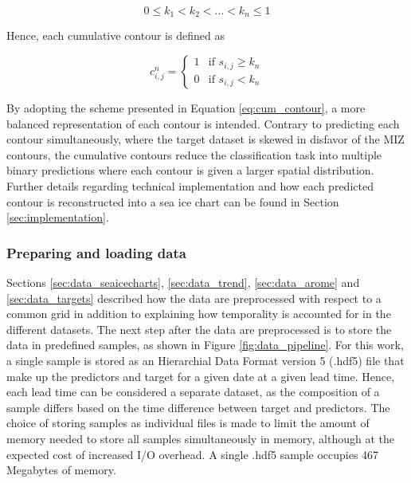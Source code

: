 \documentclass[../main/thesis]{subfiles}
\begin{document}
\begin{equation}
    \label{eq:cum_number}
    0 \leq k_1 < k_2 < \ldots < k_n \leq 1
\end{equation}

Hence, each cumulative contour is defined as

\begin{equation}
    \label{eq:cum_contour}
    c_{i,j}^n = \begin{cases}
        1 & \text{if } s_{i,j} \geq k_n \\
        0 & \text{if } s_{i,j} < k_n
    \end{cases}
\end{equation}

By adopting the scheme presented in Equation \ref{eq:cum_contour}, a more balanced representation of each contour is intended. Contrary to predicting each contour simultaneously, where the target dataset is skewed in disfavor of the MIZ contours, the cumulative contours reduce the classification task into multiple binary predictions where each contour is given a larger spatial distribution. Further details regarding technical implementation and how each predicted contour is reconstructed into a sea ice chart can be found in Section \ref{sec:implementation}.

\subsubsection{Preparing and loading data}
\label{sec:dataloader}
Sections \ref{sec:data_seaicecharts}, \ref{sec:data_trend}, \ref{sec:data_arome} and \ref{sec:data_targets} described how the data are preprocessed with respect to a common grid in addition to explaining how temporality is accounted for in the different datasets. The next step after the data are preprocessed is to store the data in predefined samples, as shown in Figure \ref{fig:data_pipeline}. For this work, a single sample is stored as an Hierarchial Data Format version 5 (.hdf5) file that make up the predictors and target for a given date at a given lead time. Hence, each lead time can be considered a separate dataset, as the composition of a sample differs based on the time difference between target and predictors. The choice of storing samples as individual files is made to limit the amount of memory needed to store all samples simultaneously in memory, although at the expected cost of increased I/O overhead. A single .hdf5 sample occupies 467 Megabytes of memory.
\end{document}
